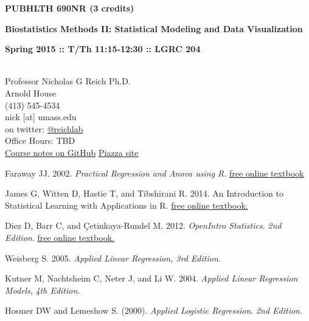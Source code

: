 \documentclass[10pt]{article}
\begin{document}
\centerline{\bf \large PUBHLTH 690NR (3 credits)} 
\centerline{\bf \large Biostatistics Methods II: Statistical Modeling and Data Visualization}
\centerline{\bf Spring 2015 :: T/Th 11:15-12:30  :: LGRC 204 }

\vspace{.25in}
\\
\noindent Professor Nicholas G Reich Ph.D. \\
 Arnold House \\
\noindent (413) 545-4534 \\
\noindent nick [at] umass.edu \\
\noindent on twitter: \href{https://twitter.com/reichlab}{@reichlab}\\
\noindent Office Hours: TBD \\
\noindent \href{https://github.com/nickreich/stat-modeling-2015}{Course notes on GitHub}
\noindent \href{https://piazza.com/umass/spring2015/pubhlth690nr/home}{Piazza site}


\bigskip
{}


Faraway JJ. 2002. \emph{Practical Regression and Anova using R}. \href{http://cran.r-project.org/doc/contrib/Faraway-PRA.pdf}{free online textbook}
  
James G, Witten D, Hastie T, and Tibshirani R. 2014.  An Introduction to Statistical Learning with Applications in R. \href{http://www-bcf.usc.edu/~gareth/ISL/}{free online textbook.}
  
Diez D, Barr C, and \c{C}etinkaya-Rundel M. 2012. \emph{OpenIntro Statistics}. \emph{2nd Edition}. \href{http://www.openintro.org/stat/index.php}{free online textbook.}


Weisberg S. 2005. \emph{Applied Linear Regression, 3rd Edition}. 

Kutner M, Nachtsheim C, Neter J, and Li W. 2004. \emph{Applied Linear Regression Models}, \emph{4th Edition}. %

Hosmer DW and Lemeshow S. (2000). \emph{Applied Logistic Regression}. \emph{2nd Edition}. %



\end{document}
